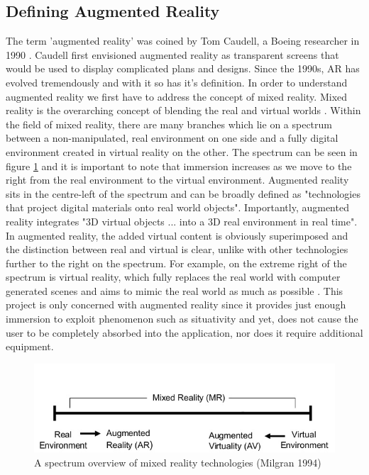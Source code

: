 \documentclass{l4proj}
\begin{document}
\subsection{Defining Augmented Reality} 
The term 'augmented reality' was coined by Tom Caudell, a Boeing researcher in 1990 \cite{rauterberg_history_2002}. Caudell first envisioned augmented reality as transparent screens that would be used to display complicated plans and designs. Since the 1990s, AR has evolved tremendously and with it so has it's definition. In order to understand augmented reality we first have to address the concept of mixed reality. Mixed reality is the overarching concept of blending the real and virtual worlds \cite{milgram_taxonomy_1994}. Within the field of mixed reality, there are many branches which lie on a spectrum between a non-manipulated, real environment on one side and a fully digital environment created in virtual reality on the other. The spectrum can be seen in figure \ref{fig:ar-spectrum} and it is important to note that immersion increases as we move to the right from the real environment to the virtual environment. Augmented reality sits in the centre-left of the spectrum and can be broadly defined as "technologies that project digital materials onto real world objects"\cite{cuendet_designing_2013}. Importantly, augmented reality integrates "3D virtual objects ... into a 3D real environment in real time"\cite{azuma_survey_1997}. In augmented reality, the added virtual content is obviously superimposed and the distinction between real and virtual is clear, unlike with other technologies further to the right on the spectrum. For example, on the extreme right of the spectrum is virtual reality, which fully replaces the real world with computer generated scenes and aims to mimic the real world as much as possible \cite{tamura_mixed_2001}. This project is only concerned with augmented reality since it provides just enough immersion to exploit phenomenon such as situativity and yet, does not cause the user to be completely absorbed into the application, nor does it require additional equipment. 

\begin{figure}[h]
\centering
\includegraphics[scale=1]{images/ar-spectrum.png}
\caption{A spectrum overview of mixed reality technologies (Milgran 1994)}
\label{fig:ar-spectrum}
\end{figure}
\end{document}
